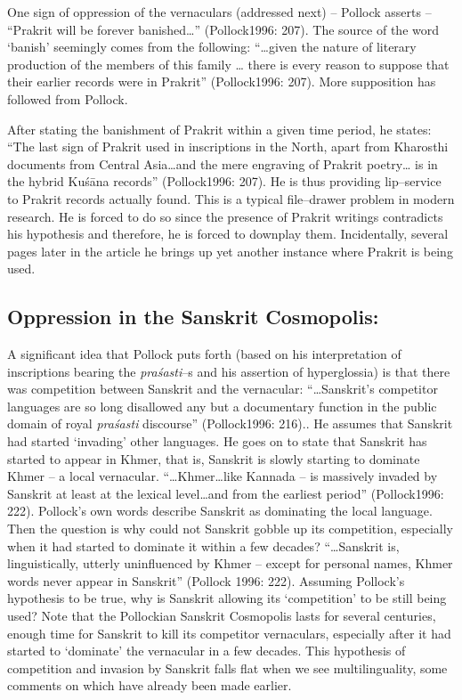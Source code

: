 One sign of oppression of the vernaculars (addressed next) – Pollock asserts – “Prakrit will be forever banished…” (Pollock1996: 207). The source of the word ‘banish’ seemingly comes from the following: “…given the nature of literary production of the members of this family … there is every reason to suppose that their earlier records were in Prakrit” (Pollock1996: 207). More supposition has followed from Pollock.

After stating the banishment of Prakrit within a given time period, he states: “The last sign of Prakrit used in inscriptions in the North, apart from Kharosthi documents from Central Asia…and the mere engraving of Prakrit poetry… is in the hybrid Kuśāna records” (Pollock1996: 207). He is thus providing lip–service to Prakrit records actually found. This is a typical file–drawer problem in modern research. He is forced to do so since the presence of Prakrit writings contradicts his hypothesis and therefore, he is forced to downplay them. Incidentally, several pages later in the article he brings up yet another instance where Prakrit is being used.


\subsection*{Oppression in the Sanskrit Cosmopolis:}

A significant idea that Pollock puts forth (based on his interpretation of inscriptions bearing the \textit{praśasti}–s and his assertion of hyperglossia) is that there was competition between Sanskrit and the vernacular: “…Sanskrit’s competitor languages are so long disallowed any but a documentary function in the public domain of royal \textit{praśasti} discourse” (Pollock1996: 216).. He assumes that Sanskrit had started ‘invading’ other languages. He goes on to state that Sanskrit has started to appear in Khmer, that is, Sanskrit is slowly starting to dominate Khmer – a local vernacular. “…Khmer…like Kannada – is massively invaded by Sanskrit at least at the lexical level…and from the earliest period” (Pollock1996: 222). Pollock’s own words describe Sanskrit as dominating the local language. Then the question is why could not Sanskrit gobble up its competition, especially when it had started to dominate it within a few decades? “…Sanskrit is, linguistically, utterly uninfluenced by Khmer – except for personal names, Khmer words never appear in Sanskrit” (Pollock 1996: 222). Assuming Pollock’s hypothesis to be true, why is Sanskrit allowing its ‘competition’ to be still being used? Note that the Pollockian Sanskrit Cosmopolis lasts for several centuries, enough time for Sanskrit to kill its competitor vernaculars, especially after it had started to ‘dominate’ the vernacular in a few decades. This hypothesis of competition and invasion by Sanskrit falls flat when we see multilinguality, some comments on which have already been made earlier.


